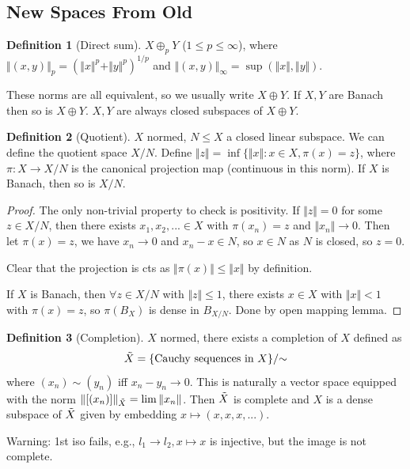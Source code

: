 \documentclass{article}
\theoremstyle{definition}
\newtheorem{defn}{Definition}[section]
\theoremstyle{remark}
\theoremstyle{plain}
\begin{document}
\subsection{New Spaces From Old}
\begin{defn}[Direct sum]
    $X\oplus_p Y$ ($1\le p\le\infty$), where $\Vert(x,y)\Vert_p=(\Vert x\Vert^p+\Vert y\Vert^p)^{1/p}$ and $\Vert (x,y)\Vert_\infty=\sup(\Vert x\Vert,\Vert y\Vert)$.
\end{defn}
These norms are all equivalent, so we usually write $X\oplus Y$.
If $X,Y$ are Banach then so is $X\oplus Y$. $X,Y$ are always closed subspaces of $X\oplus Y$.
\begin{defn}[Quotient]
    $X$ normed, $N\le X$ a closed linear subspace. We can define the quotient space $X/N$. Define $\Vert z\Vert =\inf\{\Vert x\Vert:x\in X,\pi(x)=z\}$, where $\pi:X\to X/N$ is the canonical projection map (continuous in this norm). If $X$ is Banach, then so is $X/N$.
\end{defn}
\begin{proof}
    The only non-trivial property to check is positivity. If $\Vert z\Vert=0$ for some $z\in X/N$,
    then there exists $x_1,x_2,...\in X$  with $\pi(x_n)=z$ and $\Vert x_n\Vert\to 0$. Then let $\pi(x)=z$, we have $x_n\to 0$ and $x_n-x\in N$, so $x\in N$ as $N$ is closed, so $z=0$.

    Clear that the projection is cts as $\Vert\pi(x)\Vert\le \Vert x\Vert$ by definition.

    If $X$ is Banach, then $\forall z\in X/N$ with $\Vert z\Vert\le 1$, there exists $x\in X$ with $\Vert x\Vert <1$ with $\pi(x)=z$, so $\pi(B_X)$ is dense in $B_{X/N}$. Done by open mapping lemma.
\end{proof}

\begin{defn}[Completion]
    $X$ normed, there exists a completion of $X$ defined as
    \[\Tilde{X}=\{\text{Cauchy sequences in }X\}/{\sim}\]
    where $(x_n)\sim(y_n)$ iff $x_n-y_n\to 0$. This is naturally a vector space equipped with the norm $\Vert[(x_n)]\Vert_{\Tilde{X}}=\lim\Vert x_n\Vert$. Then $\Tilde{X}$ is complete and $X$ is a dense subspace of $\Tilde{X}$ given by embedding $x\mapsto(x,x,x,...)$.
\end{defn}
Warning: 1st iso fails, e.g., $l_1\to l_2, x\mapsto x$ is injective, but the image is not complete.
\end{document}
